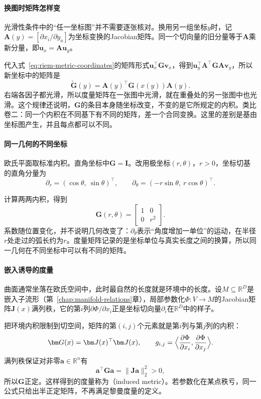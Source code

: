 \paragraph{换图时矩阵怎样变}
光滑性条件中的“任一坐标图”并不需要逐张核对。换用另一组坐标$y$时，记$\bm A(y)=[\partial x_i/\partial y_a]$为坐标变换的Jacobian矩阵。同一个切向量的旧分量等于$\bm A$乘新分量，即$\bm u_x=\bm A\bm u_y$。

代入式~\eqref{eq:riem-metric-coordinates}的矩阵形式$\bm u_x^\top\bm G\bm v_x$，得到$\bm u_y^\top\bm A^\top\bm G\bm A\bm v_y$，所以新坐标中的矩阵是
\begin{equation}
\widetilde{\bm G}(y)=\bm A(y)^{\top}\bm G(x(y))\bm A(y).
\label{eq:riem-metric-transform}
\end{equation}
右端各因子都光滑，所以度量矩阵在一张图中光滑，就在重叠处的另一张图中也光滑。这个规律还说明，$\bm G$的条目本身随坐标改变，不变的是它所规定的内积。类比卷二：同一个内积在不同基下有不同的矩阵，差一个合同变换。这里的差别是基由坐标图产生，并且每点都可以不同。

\paragraph{同一几何的不同坐标}
欧氏平面取标准内积。直角坐标中$\bm G=\bm I$。改用极坐标$(r,\theta)$，$r>0$，坐标切基的直角分量为
\[
\partial_r=(\cos\theta,\ \sin\theta)^{\top},\qquad
\partial_\theta=(-r\sin\theta,\ r\cos\theta)^{\top}.
\]

计算两两内积，得到
\[
\bm G(r,\theta)=\begin{bmatrix}1&0\\0&r^2\end{bmatrix}.
\]
系数随位置变化，并不说明几何改变了：$\partial_\theta$表示“角度增加一单位”的运动，在半径$r$处走过的弧长约为$r$。度量矩阵记录的是坐标单位与真实长度之间的换算，所以同一几何在不同坐标中可以有不同的矩阵。

\paragraph{嵌入诱导的度量}
曲面通常坐落在欧氏空间中，此时最自然的长度就是环境中的长度。设$M\subseteq\mathbb R^D$是嵌入子流形（第~\ref{chap:manifold-relations}章），局部参数化$\Phi:V\to M$的Jacobian矩阵$\bm J(x)$满列秩，它的第$i$列$\partial\Phi/\partial x_i$正是坐标切向量$\partial_i$在$\mathbb R^D$中的样子。

把环境内积限制到切空间，矩阵的第$(i,j)$个元素就是第$i$列与第$j$列的内积：
\begin{equation}
\bm G(x)=\bm J(x)^{\top}\bm J(x),\qquad
g_{i,j}=\Bigl\langle\frac{\partial\Phi}{\partial x_i},\frac{\partial\Phi}{\partial x_j}\Bigr\rangle .
\label{eq:riem-induced-metric}
\end{equation}
满列秩保证对非零$\bm a\in\mathbb R^n$有
\[
\bm a^{\top}\bm G\bm a=\lVert\bm J\bm a\rVert_2^2>0,
\]
所以$\bm G$正定。这样得到的度量称为（induced metric）。若参数化在某点秩亏，同一公式只给出半正定矩阵，不再满足黎曼度量的定义。

